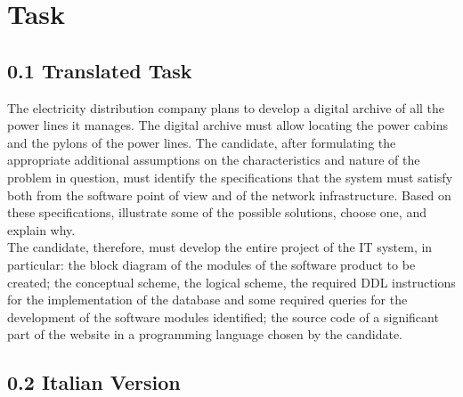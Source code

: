 
\chapter{Task} %

\label{Chapter1} %


\newcommand{\keyword}[1]{\textbf{#1}}
\newcommand{\tabhead}[1]{\textbf{#1}}
\newcommand{\code}[1]{\texttt{#1}}
\newcommand{\file}[1]{\texttt{\bfseries#1}}
\newcommand{\option}[1]{\texttt{\itshape#1}}


\section*{0.1 \hspace{1cm} Translated Task}

The electricity distribution company plans to develop a digital archive of all the power lines it manages.
The digital archive must allow locating the power cabins and the pylons of the power lines.
The candidate, after formulating the appropriate additional assumptions on the characteristics and nature of the problem in question,
must identify the specifications that the system must satisfy both from the software point of view and of the network infrastructure.
Based on these specifications, illustrate some of the possible solutions, choose one, and explain why. \\

The candidate, therefore, must develop the entire project of the IT system, in particular:
the block diagram of the modules of the software product to be created;
the conceptual scheme, the logical scheme, the required DDL instructions for the implementation of the database and some required
queries for the development of the software modules identified;
the source code of a significant part of the website in a programming language chosen by the candidate.


\section*{0.2 \hspace{1cm} Italian Version}

